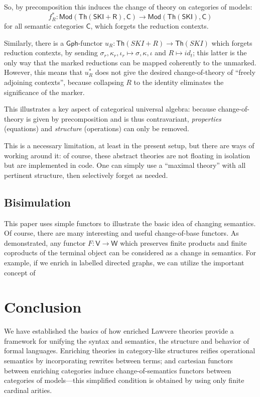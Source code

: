 \documentclass{amsart}
\theoremstyle{definition}
\newcommand{\Th}{\mathsf{Th}}
\newcommand{\Gph}{\mathsf{Gph}}
\newcommand{\Mod}{\mathsf{Mod}}
\newcommand{\V}{\mathsf{V}}
\newcommand{\W}{\mathsf{W}}
\newcommand{\C}{\mathsf{C}}
\newcommand{\maps}{\colon}
\begin{document}
So, by precomposition this induces the change of theory on categories of models: 
\[   f_R^*\maps \Mod(\Th(\mathsf{SKI} + \mathsf{R}),\C) \to \Mod(\Th(\mathsf{SKI}),\C) \]
for all semantic categories $\C$, which forgets the reduction contexts.

Similarly, there is a $\Gph$-functor $u_R\maps \Th(SKI+R)\to \Th(SKI)$ which forgets reduction contexts, by sending $\sigma_r,\kappa_r,\iota_r \mapsto\sigma, \kappa,\iota$ and $R \mapsto id_t$; this latter is the only way that the marked reductions can be mapped coherently to the unmarked. However, this means that $u_R^*$ does not give the desired change-of-theory of ``freely adjoining contexts'', because collapsing $R$ to the identity eliminates the significance of the marker.

This illustrates a key aspect of categorical universal algebra: because change-of-theory is given by precomposition and is thus contravariant, \textit{properties} (equations) and \textit{structure} (operations) can only be removed.

This is a necessary limitation, at least in the present setup, but there are ways of working around it: of course, these abstract theories are not floating in isolation but are implemented in code. One can simply use a ``maximal theory'' with all pertinent structure, then selectively forget as needed.

\subsection{Bisimulation}
\label{ssec:multisorted}

This paper uses simple functors to illustrate the basic idea of changing semantics. Of course, there are many interesting and useful change-of-base functors. As demonstrated, any functor $F\maps \V\to \W$ which preserves finite products and finite coproducts of the terminal object can be considered as a change in semantics. For example, if we enrich in labelled directed graphs, we can utilize the important concept of 

\section{Conclusion}

We have established the basics of how enriched Lawvere theories provide a framework for unifying the syntax and semantics, the structure and behavior of formal languages. Enriching theories in category-like structures reifies operational semantics by incorporating rewrites between terms; and cartesian functors between enriching categories induce change-of-semantics functors between categories of models---this simplified condition is obtained by using only finite cardinal arities.
\end{document}

